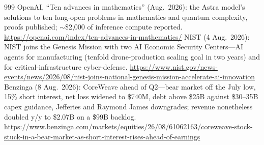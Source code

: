 \begin{thebibliography}{999}
 OpenAI, ``Ten advances in mathematics'' (Aug.\ 2026): the Astra model's solutions to ten long-open problems in mathematics and quantum complexity, proofs published; $\sim$\$2,000 of inference compute reported. \url{https://openai.com/index/ten-advances-in-mathematics/}
 NIST (4 Aug.\ 2026): NIST joins the Genesis Mission with two AI Economic Security Centers---AI agents for manufacturing (tenfold drone-production scaling goal in two years) and for critical-infrastructure cyber-defense. \url{https://www.nist.gov/news-events/news/2026/08/nist-joins-national-genesis-mission-accelerate-ai-innovation}
 Benzinga (8 Aug.\ 2026): CoreWeave ahead of Q2---bear market off the July low, 15\% short interest, net loss widened to \$740M, debt above \$25B against \$30--35B capex guidance, Jefferies and Raymond James downgrades; revenue nonetheless doubled y/y to \$2.07B on a \$99B backlog. \url{https://www.benzinga.com/markets/equities/26/08/61062163/coreweave-stock-stuck-in-a-bear-market-as-short-interest-rises-ahead-of-earnings}



\end{thebibliography}

